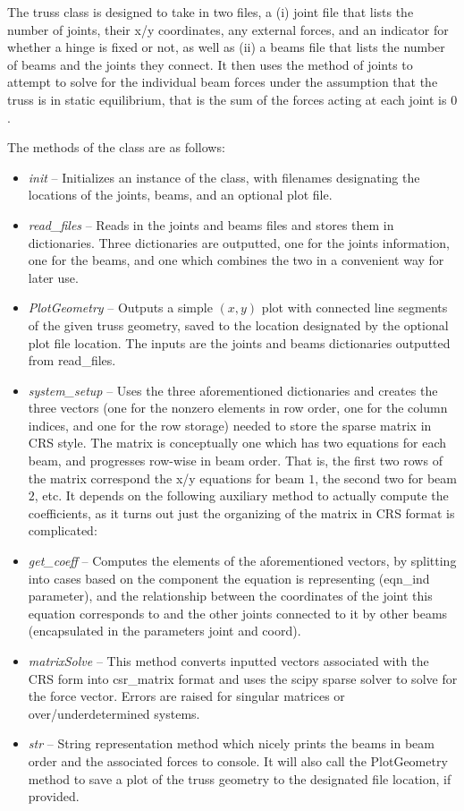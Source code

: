 \documentclass{article}
\begin{document}
The truss class is designed to take in two files, a (i) joint file that lists the number of joints, their x/y coordinates, any external forces, and an indicator for whether a hinge is fixed or not, as well as (ii) a beams file that lists the number of beams and the joints they connect.  It then uses the method of joints to attempt to solve for the individual beam forces under the assumption that the truss is in static equilibrium, that is the sum of the forces acting at each joint is $0$. 

The methods of the class are as follows:
\begin{itemize}
  \item \emph{init} -- Initializes an instance of the class, with filenames designating the locations of the joints, beams, and an optional plot file.
  \item \emph{read\_files} -- Reads in the joints and beams files and stores them in dictionaries.  Three dictionaries are outputted, one for the joints information, one for the beams, and one which combines the two in a convenient way for later use.
  \item \emph{PlotGeometry} -- Outputs a simple $(x,y)$ plot with connected line segments of the given truss geometry, saved to the location designated by the optional plot file location.  The inputs are the joints and beams dictionaries outputted from read\_files.
  \item \emph{system\_setup} -- Uses the three aforementioned dictionaries and creates the three vectors (one for the nonzero elements in row order, one for the column indices, and one for the row storage) needed to store the sparse matrix in CRS style.  The matrix is conceptually one which has two equations for each beam, and progresses row-wise in beam order.  That is, the first two rows of the matrix correspond the x/y equations for beam $1$, the second two for beam $2$, etc. It depends on the following auxiliary method to actually compute the coefficients, as it turns out just the organizing of the matrix in CRS format is complicated:
  \item \emph{get\_coeff} -- Computes the elements of the aforementioned vectors, by splitting into cases based on the component the equation is representing (eqn\_ind parameter), and the relationship between the coordinates of the joint this equation corresponds to and the other joints connected to it by other beams (encapsulated in the parameters joint and coord). 
  \item \emph{matrixSolve} -- This method converts inputted vectors associated with the CRS form into csr\_matrix format and uses the scipy sparse solver to solve for the force vector.  Errors are raised for singular matrices or over/underdetermined systems.
  \item \emph{str} -- String representation method which nicely prints the beams in beam order and the associated forces to console.  It will also call the PlotGeometry method to save a plot of the truss geometry to the designated file location, if provided. 
\end{itemize}
\end{document}
